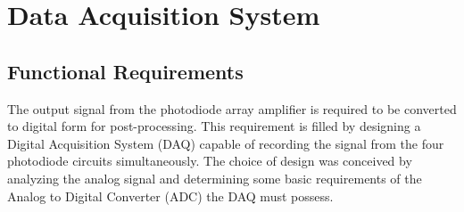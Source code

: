 \section{Data Acquisition System}





\subsection{Functional Requirements}
The output signal from the photodiode array amplifier is required to be converted to digital form for post-processing. This requirement is filled by designing a Digital Acquisition System (DAQ) capable of recording the signal from the four photodiode circuits simultaneously.
The choice of design was conceived by analyzing the analog signal and determining some basic requirements of the Analog to Digital Converter (ADC) the DAQ must possess. 
%
%
